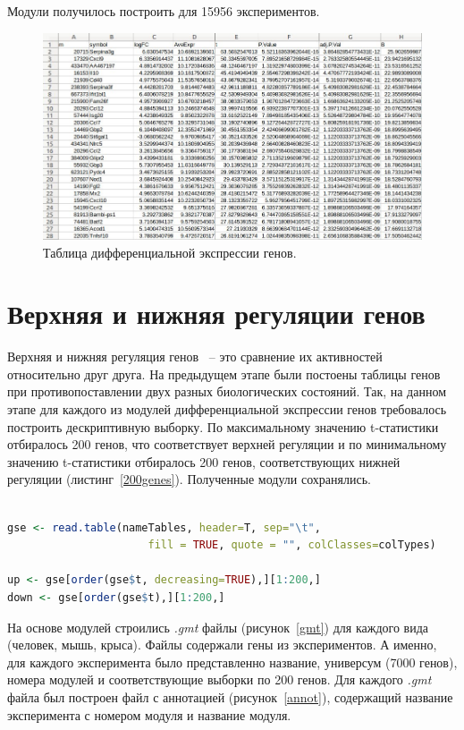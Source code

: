 \documentclass[times,specification,annotation]{itmo-student-thesis}
\begin{document}
Модули получилось построить для 15956 экспериментов.

\begin{figure}[!h]
    \caption{Таблица дифференциальной экспрессии генов.}\label{difExprs}
    \centering
    \includegraphics[width=1\textwidth]{difExprs.jpg}
\end{figure}

\section{Верхняя и нижняя регуляции генов}

Верхняя и нижняя регуляция генов ~-- это сравнение их активностей относительно друг друга. На предыдущем этапе были постоены таблицы генов при противопоставлении двух разных биологических состояний. Так, на данном этапе для каждого из модулей дифференциальной экспрессии генов требовалось построить дескриптивную выборку. По максимальному значению t-статистики отбиралось 200 генов, что соответствует верхней регуляции и по минимальному значению t-статистики отбиралось 200 генов, соответствующих нижней регуляции (листинг~\ref{200genes}). Полученные модули сохранялись. 

\begin{lstlisting}[float=!h, caption={Получение модулей по 200 генов.}, captionpos=b, label={200genes}, basicstyle=\footnotesize, language=R]

gse <- read.table(nameTables, header=T, sep="\t", 
                      fill = TRUE, quote = "", colClasses=colTypes)

up <- gse[order(gse$t, decreasing=TRUE),][1:200,]
down <- gse[order(gse$t),][1:200,]

\end{lstlisting} 

На основе модулей строились \textit{.gmt} файлы (рисунок~\ref{gmt}) для каждого вида (человек, мышь, крыса). Файлы содержали гены из экспериментов. А именно, для каждого эксперимента было представленно название, универсум (7000 генов), номера модулей и соответствующие выборки по 200 генов. Для каждого \textit{.gmt} файла был построен файл с аннотацией (рисунок~\ref{annot}), содержащий название эксперимента с номером модуля и название модуля.
\end{document}
